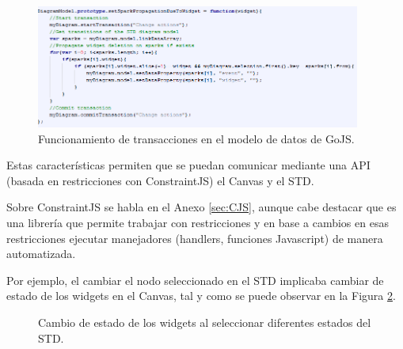 \begin{figure}
\begin{center}
\includegraphics[width=0.95\textwidth]{figs/4-GoJSTransaction.png}
\caption{Funcionamiento de transacciones en el modelo de datos de GoJS.}
\label{fig:GoJSTransaction}
\end{center}
\end{figure}

Estas características permiten que se puedan comunicar mediante una API (basada en restricciones con ConstraintJS) el Canvas y el STD.

Sobre ConstraintJS se habla en el Anexo \ref{sec:CJS}, aunque cabe destacar que es una librería que permite trabajar con restricciones y en base a cambios en esas restricciones ejecutar manejadores (handlers, funciones Javascript) de manera automatizada. 

Por ejemplo, el cambiar el nodo seleccionado en el STD implicaba cambiar de estado de los widgets en el Canvas, tal y como se puede observar en la Figura \ref{fig:WebMakeUpV1NodeSelection}.

\begin{figure}
\begin{center}
\caption{Cambio de estado de los widgets al seleccionar diferentes estados del STD.}
\label{fig:WebMakeUpV1NodeSelection}
\end{center}
\end{figure}

